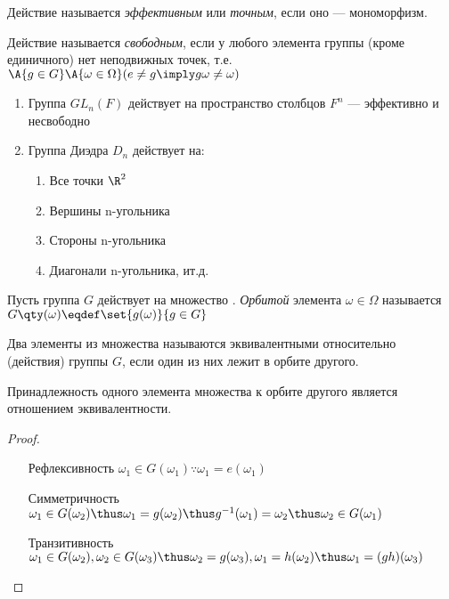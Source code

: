 \begin{definition}
  Действие называется \emph{эффективным} или \emph{точным}, если оно --- мономорфизм.
\end{definition}

\begin{definition}
  \sloppy Действие называется \emph{свободным}, если у любого элемента группы (кроме единичного) нет неподвижных точек, т.\:е. $\A{g\in G}\A{\omega\in \Omega}(e\neq g\imply g\omega\neq \omega)$
\end{definition}

\begin{definition}

\end{definition}

\begin{examples}
  \theoremlistshack
  \begin{enumerate}
    \item Группа $GL_n(F)$ действует на пространство столбцов $F^n$ --- эффективно и несвободно
    \item Группа Диэдра $D_n$ действует на:
          \begin{enumerate}
            \item Все точки $\R^2$
            \item Вершины n-угольника
            \item Стороны n-угольника
            \item Диагонали n-угольника, и\:т.\:д.
          \end{enumerate}
  \end{enumerate}
\end{examples}

\begin{definition}
  Пусть группа $G$ действует на множество \Omega. \emph{Орбитой} элемента $\omega\in \Omega$ называется $G\qty(\omega)\eqdef\set{g(\omega)}{g\in G}$
\end{definition}

\begin{definition}
  Два элементы из множества \Omega называются эквивалентными относительно (действия) группы $G$, если один из них лежит в орбите другого.
\end{definition}

\begin{theorem}
  Принадлежность одного элемента множества к орбите другого является отношением эквивалентности.
\end{theorem}
\begin{proof}
  \theoremlistshack
  \begin{itemize}[leftmargin=22ex, align=left, labelwidth=20ex]
    \item[Рефлексивность] $\omega_1\in G(\omega_1) \because \omega_1=e(\omega_1)$
    \item[Симметричность] $\omega_1\in G(\omega_2) \thus \omega_1=g(\omega_2)\thus g^{-1}(\omega_1)=\omega_2\thus \omega_2\in G(\omega_1)$
    \item[Транзитивность] $\omega_1\in G(\omega_2), \omega_2\in G(\omega_3)\thus \omega_2=g(\omega_3), \omega_1=h(\omega_2)\thus \omega_1=(gh)(\omega_3)$
  \end{itemize}
\end{proof}

